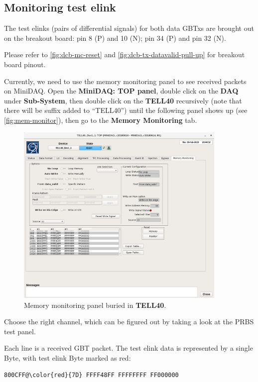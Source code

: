 \subsection{Monitoring test elink}
The test elinks (pairs of differential signals) for both data GBTxs are brought
out on the breakout board: pin 8 (P) and 10 (N); pin 34 (P) and pin 32 (N).

Please refer to
\autoref{fig:dcb-mc-reset} and \autoref{fig:dcb-tx-datavalid-pull-up} for
breakout board pinout.

Currently, we need to use the memory monitoring panel to see received packets on
MiniDAQ. Open the \textbf{MiniDAQ: TOP panel}, double click on the
\textbf{DAQ} under \textbf{Sub-System}, then double click on the \textbf{TELL40}
recursively (note that there will be suffix added to ``TELL40'') until the
following panel shows up (see \autoref{fig:mem-monitor}), then go to the
\textbf{Memory Monitoring} tab.

\begin{figure}[ht]
    \centering
    \includegraphics[width=0.9\textwidth]{res/memory_monitoring_panel.png}
    \caption{Memory monitoring panel buried in \textbf{TELL40}.}
    \label{fig:mem-monitor}
\end{figure}

Choose the right channel, which can be figured out by taking a look at the PRBS
test panel.

Each line is a received GBT packet. The test elink data is represented by a
single Byte, with test elink Byte marked as red:

\begin{lstlisting}[escapechar=@]
800CFF@\color{red}{7D} FFFF48FF FFFFFFFF FF000000
\end{lstlisting}
